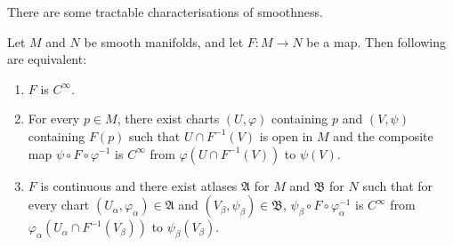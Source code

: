 \begin{comment}
We show now that smoothness implies continuity, and that the smoothness of a map is independent of the choice of charts.

\begin{lemma}\label{lem:smooth map is continuous}
    Let $M, N$ be smooth manifolds, and let $F : M \to N$ be a smooth map.
    \begin{enumerate}
        \item If $(U, \varphi)$ is arbitrary chart containing $p \in M$ and $(V, \psi)$ is arbitrary chart containing $F(p) \in N$, then $\psi\circ F \circ \varphi^{-1}$ is $C^\infty$ on $M$.
    \end{enumerate}
\end{lemma}

\begin{proof}
    (i) Let $p \in M$ be arbitrary. Suppose that $F$ is smooth at $p$. By definition, there are charts $(U, \varphi)$ containing $p \in M$ and $(V, \psi)$ containing $F(p) \in N$ such that $F(U) \subset V$ and the composite $\psi \circ F \circ \varphi^{-1}$ is $C^\infty$ at $\varphi(p)$ from $\varphi(U)$ to $\psi(V)$, hence $F$ is continuous on $\varphi(U)$. Since $\varphi : U \to \varphi(U)$ and $\psi : V \to \psi(V)$ are homeomorphisms, then the composite of continuous maps $F = \psi^{-1} \circ (\psi \circ F \circ \varphi^{-1}) \circ \varphi$ from $U$ to $V$ is also continuous. Since $p$ is arbitrary, $F$ is continuous.
\end{proof}
\end{comment}

There are some tractable characterisations of smoothness.

\begin{proposition}\label{lem:characterisation of smooth maps}
    Let $M$ and $N$ be smooth manifolds, and let $F : M \to N$ be a map. Then following are equivalent:
    \begin{enumerate}
        \item $F$ is $C^\infty$.
        \item For every $p \in M$, there exist charts $(U, \varphi)$ containing $p$ and $(V, \psi)$ containing $F(p)$ such that $U \cap F^{-1}(V)$ is open in $M$ and the composite map $\psi \circ F \circ \varphi^{-1}$ is $C^\infty$ from $\varphi(U \cap F^{-1}(V))$ to $\psi(V)$.
        \item $F$ is continuous and there exist atlases $\mathfrak{A}$ for $M$ and $\mathfrak{B}$ for $N$ such that for every chart $(U_\alpha, \varphi_\alpha) \in \mathfrak{A}$ and $(V_\beta, \psi_\beta) \in \mathfrak{B}$, $\psi_\beta \circ F \circ \varphi_\alpha^{-1}$ is $C^\infty$ from $\varphi_\alpha(U_\alpha \cap F^{-1}(V_\beta))$ to $\psi_\beta(V_\beta)$.
    \end{enumerate}
\end{proposition}

